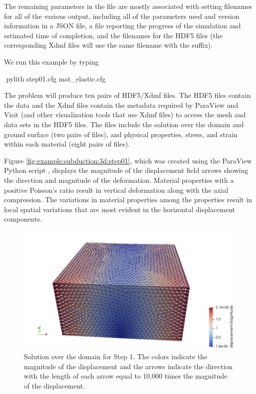 The remaining parameters in the  file are mostly
associated with setting filenames for all of the various output,
including all of the parameters used and version information in a JSON
file, a file reporting the progress of the simulation and estimated
time of completion, and the filenames for the HDF5 files (the
corresponding Xdmf files will use the same filename with the
 suffix).

We run this example by typing
\begin{shell}
$$ pylith step01.cfg mat_elastic.cfg
\end{shell}
The problem will produce ten pairs of HDF5/Xdmf files. The HDF5
files contain the data and the Xdmf files contain the metadata required
by ParaView and Visit (and other visualization tools that
use Xdmf files) to access the mesh and data sets in the HDF5 files.
The files include the solution over the domain and ground surface
(two pairs of files), and physical properties, stress, and strain within
each material (eight pairs of files). 

Figure \vref{fig:example:subduction:3d:step01}, which was created
using the ParaView Python script , displays
the magnitude of the displacement field arrows showing the direction
and magnitude of the deformation. Material properties with a positive
Poisson's ratio result in vertical deformation along with the axial
compression. The variations in material properties among the
properties result in local spatial variations that are most evident in
the horizontal displacement components.

\begin{figure}
  \includegraphics[width=5.0in]{examples/figs/subduction3d_step01_soln}
  \caption{Solution over the domain for Step 1. The colors indicate
    the magnitude of the displacement and the arrows indicate the
    direction with the length of each arrow equal to 10,000 times the
    magnitude of the displacement.}
  \label{fig:example:subduction:3d:step01}
\end{figure}


